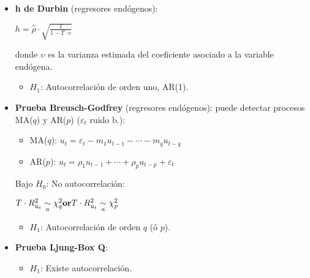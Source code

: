 \documentclass[10pt, a4paper, landscape]{extarticle}
\begin{document}
\begin{multicols}{3}
\begin{itemize}[leftmargin=*]
\begin{itemize}[leftmargin=*]
\begin{center}
		\end{center}
		\item \textbf{h de Durbin} (regresores endógenos):
		\begin{center}
			$h = \hat{\rho} \cdot \sqrt{\frac{T}{1 - T \cdot \upsilon}}$
		\end{center}
		donde $\upsilon$ es la varianza estimada del coeficiente asociado a la variable endógena.
		\begin{itemize}[leftmargin=*]
			\item $H_1$: Autocorrelación de orden uno, AR(1).
		\end{itemize}
		\item \textbf{Prueba Breusch-Godfrey} (regresores endógenos): puede detectar procesos MA($q$) y AR($p$) ($\varepsilon_t$ ruido b.):
		\begin{itemize}[leftmargin=*]
			\item MA($q$): $u_t = \varepsilon_t - m_1 u_{t - 1} - \cdots - m_q u_{t - q}$
			\item AR($p$): $u_t = \rho_1 u_{t - 1} + \cdots + \rho_p u_{t - p} + \varepsilon_t$
		\end{itemize}
		Bajo $H_0$: No autocorrelación:
		\begin{center}
			$\hfill T \cdot R^2_{\hat{u}_t} \underset{a}{\sim} \chi^2_q \hfill \textbf{or} \hfill T \cdot R^2_{\hat{u}_t} \underset{a}{\sim} \chi^2_p \hfill$
		\end{center}
		\begin{itemize}[leftmargin=*]
			\item $H_1$: Autocorrelación de orden $q$ (ó $p$).
		\end{itemize}
		\item \textbf{Prueba Ljung-Box Q}:
		\begin{itemize}[leftmargin=*]
			\item $H_1$: Existe autocorrelación.
		\end{itemize}
	\end{itemize}


\end{itemize}
\end{multicols}
\end{document}
